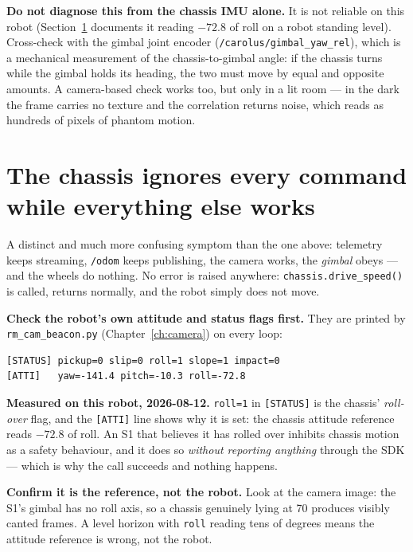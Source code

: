 \documentclass[11pt]{report}
\newenvironment{warningbox}%
  {\begin{lrbox}{\warnbox}\begin{minipage}{0.90\textwidth}}%
  {\end{minipage}\end{lrbox}%
   \begin{center}\fcolorbox{black}{codebg}{\usebox{\warnbox}}\end{center}}
\begin{document}
\begin{warningbox}
\textbf{Do not diagnose this from the chassis IMU alone.} It is not reliable
on this robot (Section~\ref{sec:chassis-inhibited} documents it reading
$-72.8$\textdegree{} of roll on a robot standing level). Cross-check with the
gimbal joint encoder (\texttt{/carolus/gimbal\_yaw\_rel}), which is a
mechanical measurement of the chassis-to-gimbal angle: if the chassis turns
while the gimbal holds its heading, the two must move by equal and opposite
amounts. A camera-based check works too, but only in a lit room --- in the
dark the frame carries no texture and the correlation returns noise, which
reads as hundreds of pixels of phantom motion.
\end{warningbox}

\section{The chassis ignores every command while everything else works}
\label{sec:chassis-inhibited}

A distinct and much more confusing symptom than the one above: telemetry
keeps streaming, \texttt{/odom} keeps publishing, the camera works, the
\emph{gimbal} obeys --- and the wheels do nothing. No error is raised
anywhere: \texttt{chassis.drive\_speed()} is called, returns normally, and
the robot simply does not move.

\textbf{Check the robot's own attitude and status flags first.} They are
printed by \texttt{rm\_cam\_beacon.py} (Chapter~\ref{ch:camera}) on every
loop:

\begin{lstlisting}[style=code]
[STATUS] pickup=0 slip=0 roll=1 slope=1 impact=0
[ATTI]   yaw=-141.4 pitch=-10.3 roll=-72.8
\end{lstlisting}

\textbf{Measured on this robot, 2026-08-12.} \texttt{roll=1} in
\texttt{[STATUS]} is the chassis' \emph{roll-over} flag, and the
\texttt{[ATTI]} line shows why it is set: the chassis attitude reference
reads $-72.8$\textdegree{} of roll. An S1 that believes it has rolled over
inhibits chassis motion as a safety behaviour, and it does so \emph{without
reporting anything} through the SDK --- which is why the call succeeds and
nothing happens.

\textbf{Confirm it is the reference, not the robot.} Look at the camera
image: the S1's gimbal has no roll axis, so a chassis genuinely lying at
70\textdegree{} produces visibly canted frames. A level horizon with
\texttt{roll} reading tens of degrees means the attitude reference is
wrong, not the robot.
\end{document}
